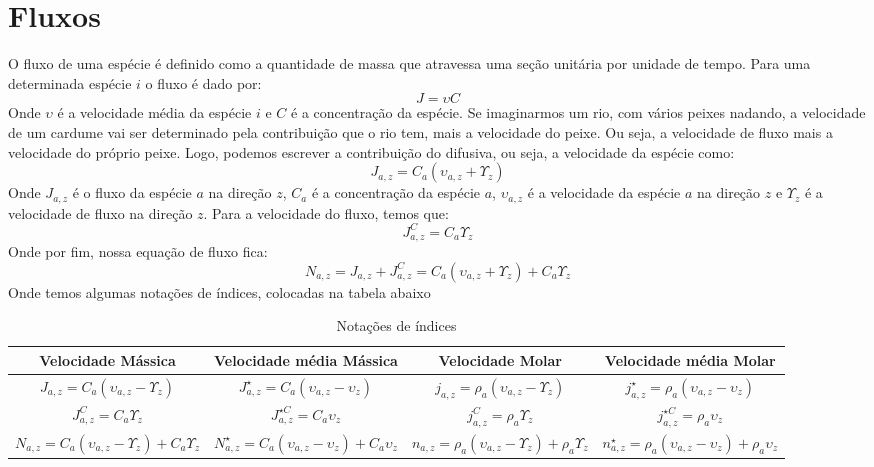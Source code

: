 \section{Fluxos} 
O fluxo de uma espécie é definido como a quantidade de massa que atravessa uma seção unitária por
unidade de tempo. Para uma determinada espécie \(i\) o fluxo é dado por:
\begin{equation}\label{eq:fluxo}
    J = \upsilon C
\end{equation}
Onde \(\upsilon \) é a velocidade média da espécie \(i\) e \(C\) é a concentração da espécie. Se
imaginarmos um rio, com vários peixes nadando, a velocidade de um cardume vai ser determinado pela
contribuição que o rio tem, mais a velocidade do peixe. Ou seja, a velocidade de fluxo mais a
velocidade do próprio peixe. Logo, podemos escrever a contribuição do difusiva, ou seja, a
velocidade da espécie como:
\begin{equation}\label{eq:contribuição_espécie}
    J_{a,z} = C_a(\upsilon_{a,z} + \Upsilon_{z} )
\end{equation}
Onde \(J_{a,z}\) é o fluxo da espécie \(a\) na direção \(z\), \(C_a\) é a concentração da espécie \(a\),
\(\upsilon_{a,z}\) é a velocidade da espécie \(a\) na direção \(z\) e \(\Upsilon_{z}\) é a
velocidade de fluxo na direção \(z\). Para a velocidade do fluxo, temos que:
\begin{equation}\label{eq:contribuição_fluxo}
    J_{a,z}^C =  C_{a} \Upsilon _{z} 
\end{equation}
Onde por fim, nossa equação de fluxo fica:
\begin{equation}\label{eq:fluxo_final}
    N_{a,z} = J_{a,z} + J_{a,z}^C = C_a(\upsilon_{a,z} + \Upsilon_{z} ) + C_{a} \Upsilon _{z}
\end{equation}
Onde temos algumas notações de índices, colocadas na tabela abaixo
\begin{table}[H]
\centering
\begin{adjustbox}{width=1\textwidth, center=\textwidth}
\begin{tabular}{c|c|c|c}
\toprule
Velocidade Mássica  & Velocidade média Mássica & Velocidade Molar & Velocidade média Molar  \\
 \midrule
\(J_{a,z} = C_a(\upsilon_{a,z} - \Upsilon_{z} )\)   & \(J_{a,z}^{\star}  = C_a(\upsilon_{a,z} - \upsilon_{z} )\)  & \(j_{a,z} = \rho _a(\upsilon_{a,z} - \Upsilon_{z} )\)   & \(j_{a,z}^{\star}  = \rho _a(\upsilon_{a,z} - \upsilon_{z} )\)  \\
\(J_{a,z}^C =  C_{a} \Upsilon _{z}\)   & \(J_{a,z}^{\star C}  =  C_{a} \upsilon _{z} \)   &  \(j_{a,z}^C =  \rho _{a} \Upsilon _{z}\)   & \(j_{a,z}^{\star C}  =  \rho _{a} \upsilon _{z} \)\\
\(N_{a,z} =C_a(\upsilon_{a,z} - \Upsilon_{z} ) + C_{a} \Upsilon _{z}\)   & \(N_{a,z}^{\star} = C_a(\upsilon_{a,z} - \upsilon_{z} ) + C_{a} \upsilon _{z}\) &  \(n_{a,z} = \rho _a(\upsilon_{a,z} - \Upsilon_{z} ) + \rho _{a} \Upsilon _{z}\)   & \(n_{a,z}^{\star} = \rho _a(\upsilon_{a,z} - \upsilon_{z} ) + \rho _{a} \upsilon _{z}\)\\
\bottomrule
\end{tabular}
\end{adjustbox}
\caption{Notações de índices}
\label{tab:not_indices}
\end{table}
